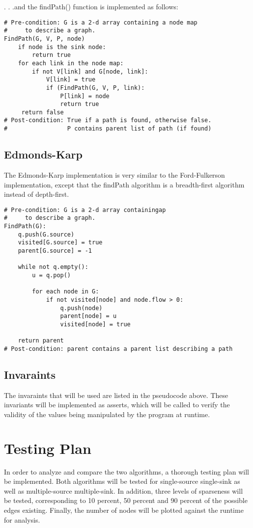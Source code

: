 \documentclass[12pt]{report}
\begin{document}
 . . .and the findPath() function is implemented as follows:
 
\begin{lstlisting}[frame=single]
# Pre-condition: G is a 2-d array containing a node map 
#     to describe a graph.
FindPath(G, V, P, node)
	if node is the sink node:
    	return true
    for each link in the node map:
    	if not V[link] and G[node, link]:
        	V[link] = true
            if (FindPath(G, V, P, link):
            	P[link] = node
                return true
     return false
# Post-condition: True if a path is found, otherwise false.
#                 P contains parent list of path (if found)
\end{lstlisting}

\subsection*{Edmonds-Karp}

The Edmonds-Karp implementation is very similar to the Ford-Fulkerson implementation, except that the findPath algorithm is a breadth-first algorithm instead of depth-first.

\begin{lstlisting}[frame=single]
# Pre-condition: G is a 2-d array containingap 
#     to describe a graph.
FindPath(G):
	q.push(G.source)
    visited[G.source] = true
    parent[G.source] = -1
    
    while not q.empty():
    	u = q.pop()
        
        for each node in G:
        	if not visited[node] and node.flow > 0:
            	q.push(node)
                parent[node] = u
                visited[node] = true
    
    return parent
# Post-condition: parent contains a parent list describing a path
\end{lstlisting}

\subsection*{Invaraints}
The invaraints that will be used are listed in the pseudocode above. These invariants will be implemented as asserts, which will be called to verify the validity of the values being manipulated by the program at runtime.

\section*{Testing Plan}
In order to analyze and compare the two algorithms, a thorough testing plan will be implemented. Both algorithms will be tested for single-source single-sink as well as multiple-source multiple-sink. In addition, three levels of sparseness will be tested, corresponding to 10 percent, 50 percent and 90 percent of the possible edges existing. Finally, the number of nodes will be plotted against the runtime for analysis.
\end{document}
